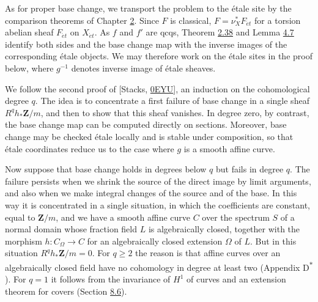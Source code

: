 \documentclass[11pt]{article}
\newcommand{\bpout}[1]{#1\textsuperscript{\hyperlink{bp-outside}{\ensuremath{\ast}}}}
\begin{document}
\label{bp644}%
As for proper base change, we transport the problem to the étale site by the comparison theorems of Chapter \hyperref[bp3]{2}. Since \(F\) is classical, \(F=\nu_X^*F_{\acute{e}t}\) for a torsion abelian sheaf \(F_{\acute{e}t}\) on \(X_{\acute{e}t}\). As \(f\) and \(f'\) are qcqs, Theorem \hyperref[bp113]{2.38} and Lemma \hyperref[bp304]{4.7} identify both sides and the base change map with the inverse images of the corresponding étale objects. We may therefore work on the étale sites in the proof below, where \(g^{-1}\) denotes inverse image of étale sheaves.

We follow the second proof of [Stacks, \href{https://stacks.math.columbia.edu/tag/0EYU}{0EYU}], an induction on the cohomological degree \(q\). The idea is to concentrate a first failure of base change in a single sheaf \(R^qh_*\mathbf Z/m\), and then to show that this sheaf vanishes. In degree zero, by contrast, the base change map can be computed directly on sections. Moreover, base change may be checked étale locally and is stable under composition, so that étale coordinates reduce us to the case where \(g\) is a smooth affine curve.

Now suppose that base change holds in degrees below \(q\) but fails in degree \(q\). The failure persists when we shrink the source of the direct image by limit arguments, and also when we make integral changes of the source and of the base. In this way it is concentrated in a single situation, in which the coefficients are constant, equal to \(\mathbf Z/m\), and we have a smooth affine curve \(C\) over the spectrum \(S\) of a normal domain whose fraction field \(L\) is algebraically closed, together with the morphism \(h:C_\Omega\to C\) for an algebraically closed extension \(\Omega\) of \(L\). But in this situation \(R^qh_*\mathbf Z/m=0\). For \(q\geq2\) the reason is that affine curves over an algebraically closed field have no cohomology in degree at least two (Appendix \bpout{D}). For \(q=1\) it follows from the invariance of \(H^1\) of curves and an extension theorem for covers (Section \hyperref[bp666]{8.6}).


\end{document}
